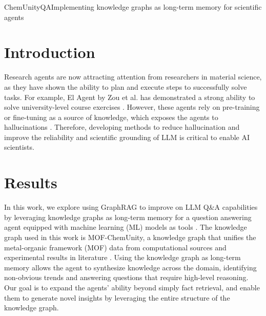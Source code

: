 
\begin{teamsubmission}{ChemUnityQA}{Implementing knowledge graphs as long-term memory for scientific agents}

\section*{Introduction}
Research agents are now attracting attention from researchers in material science, as they have shown the ability to plan and execute steps to successfully solve tasks. For example, El Agent by Zou et al. has demonstrated a strong ability to solve university-level course exercises \cite{zou2025agente}. However, these agents rely on pre-training or fine-tuning as a source of knowledge, which exposes the agents to hallucinations \cite{zhang2024knowledge, mckenna2023sources}. Therefore, developing methods to reduce hallucination and improve the reliability and scientific grounding of LLM is critical to enable AI scientists. 

\section*{Results}
In this work, we explore using GraphRAG to improve on LLM Q\&A capabilities by leveraging knowledge graphs as long-term memory for a question answering agent equipped with machine learning (ML) models as tools \cite{edge2025graphrag}. The knowledge graph used in this work is MOF-ChemUnity, a knowledge graph that unifies the metal-organic framework (MOF) data from computational sources and experimental results in literature \cite{pruyn2025chemunity}. Using the knowledge graph as long-term memory allows the agent to synthesize knowledge across the domain, identifying non-obvious trends and answering questions that require high-level reasoning. Our goal is to expand the agents’ ability beyond simply fact retrieval, and enable them to generate novel insights by leveraging the entire structure of the knowledge graph.


\end{teamsubmission}
